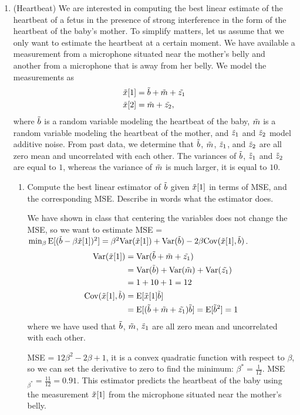 \documentclass[12pt,twoside]{article}
\begin{document}
\begin{enumerate}
 \item (Heartbeat) We are interested in computing the best linear estimate of the heartbeat of a fetus in the presence of strong interference in the form of the heartbeat of the baby's mother. To simplify matters, let us assume that we only want to estimate the heartbeat at a certain moment. We have available a measurement from a microphone situated near the mother's belly and another from a microphone that is away from her belly. We model the measurements as
\begin{align}
\tilde{  x }[1] & = \tilde{  b } + \tilde{ m } + \tilde{ z_1 }\\
\tilde{  x }[2] & = \tilde{ m } + \tilde{ z_2 },
\end{align}
where $\tilde{  b }$ is a random variable modeling the heartbeat of the baby, $\tilde{ m }$ is a random variable modeling the heartbeat of the mother, and $\tilde{ z }_1$ and $\tilde{ z }_2$ model additive noise. From past data, we determine that $\tilde{  b }$, $\tilde{ m }$, $\tilde{ z }_1$, and $\tilde{ z }_2$ are all zero mean and uncorrelated with each other. The variances of $\tilde{  b }$, $\tilde{ z }_1$ and $\tilde{ z }_2$ are equal to $1$, whereas the variance of $\tilde{ m }$ is much larger, it is equal to $10$.
\begin{enumerate}
\item Compute the best linear estimator of $\tilde{  b }$ given $\tilde{  x }[1]$ in terms of MSE, and the corresponding MSE. Describe in words what the estimator does. 

We have shown in class that centering the variables does not change the MSE, so we want to estimate 
MSE = $\min_\beta \E[(\rb - \beta \rx[1])^2] = \beta^2 \var(\rx[1]) + \var(\rb) -2 \beta \cov(\rx[1], \rb)$.
\begin{align*}
	 \var(\rx[1])		&= 	\var(\rb + \rnd{m} + \rnd{z_1}) \\
	 				&= 	\var(\rb) + \var(\rnd{m} )	+ \var(\rnd{z_1})	\\
					&=	1 + 10 + 1	=12	 \\
	\cov(\rx[1], \rb)		&=	\E[\rx[1] \rb]	\\
					&= 	\E[ (\rb + \rnd{m} + \rnd{z_1}) \rb] = \E[\rb^2] = 1
\end{align*}
where we have used  that $\tilde{  b }$, $\tilde{ m }$, $\tilde{ z }_1$ are all zero mean and uncorrelated with each other.

MSE = $12 \beta^2 -2 \beta + 1$, it is a convex quadratic function with respect to $\beta$, so we can set the derivative to zero to find the minimum: $\beta^* = \frac{1}{12}$.
MSE$_{\beta^*} = \frac{11}{12} = 0.91$. This estimator predicts the heartbeat of the baby using the measurement $\tilde{  x }[1]$ from the microphone situated near  the mother's belly.


\end{enumerate}
\end{enumerate}
\end{document}
